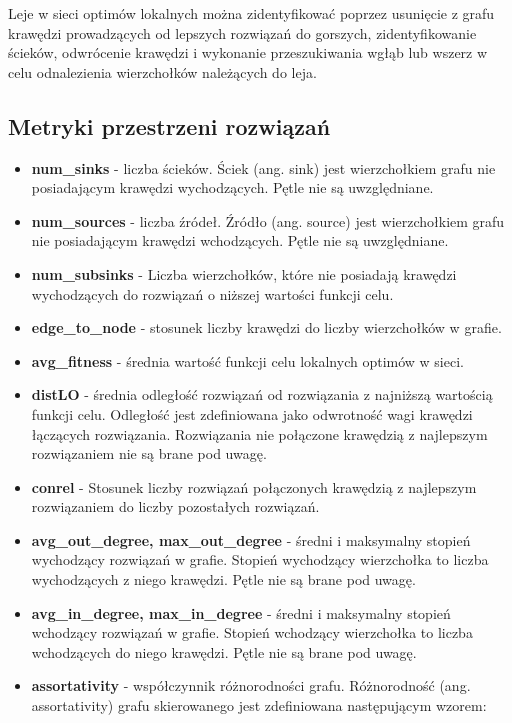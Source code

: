 Leje w sieci optimów lokalnych można zidentyfikować poprzez usunięcie z grafu krawędzi prowadzących od lepszych rozwiązań do gorszych,
zidentyfikowanie ścieków, odwrócenie krawędzi i wykonanie przeszukiwania wgłąb lub wszerz w celu odnalezienia wierzchołków należących do leja.
\subsection{Metryki przestrzeni rozwiązań} \label{sec:metrics}

\begin{itemize}
      \item \textbf{num\_sinks} - liczba ścieków. Ściek (ang. sink) jest wierzchołkiem grafu nie posiadającym krawędzi wychodzących.
            Pętle nie są uwzględniane.
      \item \textbf{num\_sources} - liczba źródeł. Źródło (ang. source) jest wierzchołkiem grafu nie posiadającym krawędzi wchodzących.
            Pętle nie są uwzględniane.
      \item \textbf{num\_subsinks} - Liczba wierzchołków, które nie posiadają krawędzi wychodzących do rozwiązań o niższej wartości funkcji celu.
      \item \textbf{edge\_to\_node} - stosunek liczby krawędzi do liczby wierzchołków w grafie.
      \item \textbf{avg\_fitness} - średnia wartość funkcji celu lokalnych optimów w sieci.
      \item \textbf{distLO} - średnia odległość rozwiązań od rozwiązania z najniższą wartością funkcji celu. Odległość jest zdefiniowana jako odwrotność wagi krawędzi łączących rozwiązania.
            Rozwiązania nie połączone krawędzią z najlepszym rozwiązaniem nie są brane pod uwagę.
      \item \textbf{conrel} - Stosunek liczby rozwiązań połączonych krawędzią z najlepszym rozwiązaniem do liczby pozostałych rozwiązań.
      \item \textbf{avg\_out\_degree, max\_out\_degree} - średni i maksymalny stopień wychodzący rozwiązań w grafie. Stopień wychodzący wierzchołka to liczba wychodzących z niego krawędzi. Pętle nie są brane pod uwagę.
      \item \textbf{avg\_in\_degree, max\_in\_degree} - średni i maksymalny stopień wchodzący rozwiązań w grafie. Stopień wchodzący wierzchołka to liczba wchodzących do niego krawędzi. Pętle nie są brane pod uwagę.
      \item \textbf{assortativity} - współczynnik różnorodności grafu.  Różnorodność (ang. assortativity) grafu skierowanego jest zdefiniowana następującym wzorem:

\end{itemize}
